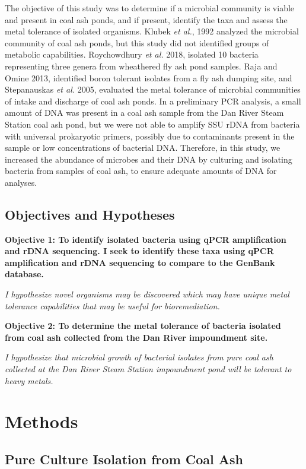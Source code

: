 \documentclass[ms, hidelinks]{uncgdissertationexp3}
\theoremstyle{plain}
\theoremstyle{definition}
\theoremstyle{remark}
\begin{document}
The objective of this study was to determine if a microbial community is viable and present in coal ash ponds, and if present, identify the taxa and assess the metal tolerance of isolated organisms. Klubek \emph{et al.}, 1992 analyzed the microbial community of coal ash ponds, but this study did not identified groups of metabolic capabilities. Roychowdhury \emph{et al.} 2018, isolated 10 bacteria representing three genera from wheathered fly ash pond samples. Raja and Omine 2013, identified boron tolerant isolates from a fly ash dumping site, and Stepanauskas \emph{et al.} 2005, evaluated the metal tolerance of microbial communities of intake and discharge of coal ash ponds. In a preliminary PCR analysis, a small amount of DNA was present in a coal ash sample from the Dan River Steam Station coal ash pond, but we were not able to amplify SSU rDNA from bacteria with universal prokaryotic primers, possibly due to contaminants present in the sample or low concentrations of bacterial DNA. Therefore, in this study, we increased the abundance of microbes and their DNA by culturing and isolating bacteria from samples of coal ash, to ensure adequate amounts of DNA for analyses.


\subsection{Objectives and Hypotheses}\label{objectives-and-hypotheses}
\textbf{Objective 1: To identify isolated bacteria using qPCR amplification and rDNA sequencing. I seek to identify these taxa using qPCR amplification and rDNA sequencing to compare to the GenBank database.}

\emph{I hypothesize novel organisms may be discovered which may have unique metal tolerance capabilities that may be useful for bioremediation.}

\textbf{Objective 2: To determine the metal tolerance of bacteria isolated from coal ash collected from the Dan River impoundment site.}

\emph{I hypothesize that microbial growth of bacterial isolates from pure coal ash collected at the Dan River Steam Station impoundment pond will be tolerant to heavy metals.}


\section{Methods}\label{methods-1}
\subsection{Pure Culture Isolation from Coal Ash}\label{pure-culture-isolation-from-coal-ash}
\end{document}
